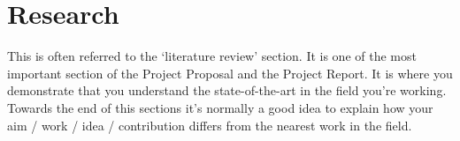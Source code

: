 
\chapter{Research}

This is often referred to the ‘literature review’ section. It is one of the most important
section of the Project Proposal and the Project Report. It is where you demonstrate that you
understand the state-of-the-art in the field you’re working. Towards the end of this sections it’s
normally a good idea to explain how your aim / work / idea / contribution differs from the nearest
work in the field.
